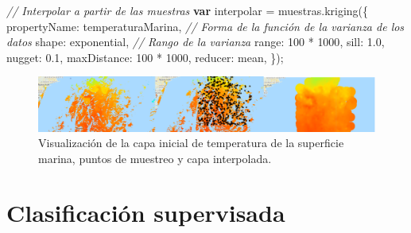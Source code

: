 \documentclass[
  12pt,
  letterpaper,
  twoside]{book}
\newenvironment{Shaded}{\begin{snugshade}}{\end{snugshade}}
\newcommand{\CommentTok}[1]{\textcolor[rgb]{0.24,0.58,0.00}{\textit{#1}}}
\newcommand{\ControlFlowTok}[1]{\textcolor[rgb]{0.00,0.00,0.00}{\textbf{#1}}}
\newcommand{\DataTypeTok}[1]{\textcolor[rgb]{0.00,0.00,0.00}{#1}}
\newcommand{\DecValTok}[1]{\textcolor[rgb]{0.28,0.53,0.93}{#1}}
\newcommand{\FloatTok}[1]{\textcolor[rgb]{0.28,0.53,0.93}{#1}}
\newcommand{\FunctionTok}[1]{\textcolor[rgb]{0.48,0.12,0.64}{#1}}
\newcommand{\NormalTok}[1]{#1}
\newcommand{\OperatorTok}[1]{\textcolor[rgb]{0.00,0.00,0.00}{#1}}
\newcommand{\StringTok}[1]{\textcolor[rgb]{0.87,0.29,0.22}{#1}}
\begin{document}
\begin{Shaded}
\begin{Highlighting}[]
\CommentTok{// Interpolar a partir de las muestras}
\ControlFlowTok{var}\NormalTok{ interpolar }\OperatorTok{=}\NormalTok{ muestras}\OperatorTok{.}\FunctionTok{kriging}\NormalTok{(\{}
  \DataTypeTok{propertyName}\OperatorTok{:} \StringTok{\textquotesingle{}temperaturaMarina\textquotesingle{}}\OperatorTok{,}
  \CommentTok{// Forma de la función de la varianza de los datos}
  \DataTypeTok{shape}\OperatorTok{:} \StringTok{\textquotesingle{}exponential\textquotesingle{}}\OperatorTok{,} 
  \CommentTok{// Rango de la varianza}
  \DataTypeTok{range}\OperatorTok{:} \DecValTok{100} \OperatorTok{*} \DecValTok{1000}\OperatorTok{,} 
  \DataTypeTok{sill}\OperatorTok{:} \FloatTok{1.0}\OperatorTok{,}
  \DataTypeTok{nugget}\OperatorTok{:} \FloatTok{0.1}\OperatorTok{,}
  \DataTypeTok{maxDistance}\OperatorTok{:} \DecValTok{100} \OperatorTok{*} \DecValTok{1000}\OperatorTok{,}
  \DataTypeTok{reducer}\OperatorTok{:} \StringTok{\textquotesingle{}mean\textquotesingle{}}\OperatorTok{,}
\NormalTok{\})}\OperatorTok{;}
\end{Highlighting}
\end{Shaded}

\begin{figure}[H]

{\centering \includegraphics[width=0.95\linewidth]{Img/kriging} 

}

\caption{Visualización de la capa inicial de temperatura de la superficie marina, puntos de muestreo y capa interpolada.}\label{fig:fc114}
\end{figure}

\newpage

\hypertarget{clasificaciuxf3n-supervisada}{%
\chapter{Clasificación supervisada}\label{clasificaciuxf3n-supervisada}}
\end{document}
